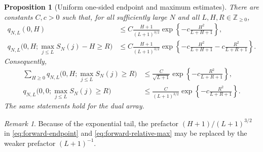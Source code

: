 \documentclass[11pt]{article}
\theoremstyle{plain}
\newtheorem{proposition}[lemma]{Proposition}
\theoremstyle{definition}
\theoremstyle{remark}
\newtheorem{remark}[lemma]{Remark}
\newcommand{\Z}{\mathbb Z}
\begin{document}
\begin{proposition}[Uniform one-sided endpoint and maximum estimates]
\label{prop:killed-bounds}
There are constants \(C,c>0\) such that, for all sufficiently large
\(N\) and all \(L,H,R\in\Z_{\ge0}\),
\begin{align}
 q_{N,L}(0,H)
 &\le C\frac{H+1}{(L+1)^{3/2}}
 \exp\left\{-c\frac{H^2}{L+H+1}\right\},         \label{eq:forward-endpoint}\\
 q_{N,L}\bigl(0,H;\max_{j\le L}S_N(j)-H\ge R\bigr)
 &\le C\frac{H+1}{(L+1)^{3/2}}
 \exp\left\{
   -c\frac{H^2}{L+H+1}
   -c\frac{R^2}{L+R+1}
 \right\}.                   \label{eq:forward-relative-max}
\end{align}
Consequently,
\begin{align}
 \sum_{H\ge0}
 q_{N,L}\bigl(0,H;\max_{j\le L}S_N(j)\ge R\bigr)
 &\le \frac{C}{\sqrt{L+1}}
 \exp\left\{-c\frac{R^2}{L+R+1}\right\},
 \label{eq:summed-reverse}\\
 q_{N,L}\bigl(0,0;\max_{j\le L}S_N(j)\ge R\bigr)
 &\le \frac{C}{(L+1)^{3/2}}
 \exp\left\{-c\frac{R^2}{L+R+1}\right\}.
 \label{eq:excursion-max}
\end{align}
The same statements hold for the dual array.
\end{proposition}
\begin{remark}
Because of the exponential tail, the prefactor
\((H+1)/(L+1)^{3/2}\) in \eqref{eq:forward-endpoint} and
\eqref{eq:forward-relative-max} may be replaced by the weaker prefactor
\((L+1)^{-1}\).
\end{remark}
\end{document}
